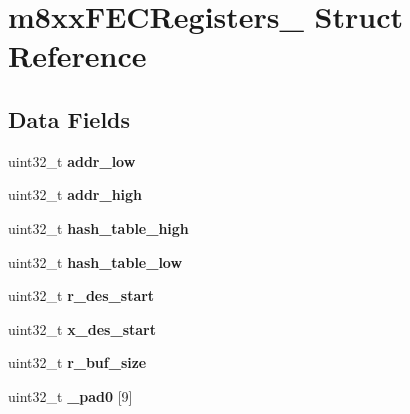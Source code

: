 \hypertarget{structm8xxFECRegisters__}{}\section{m8xx\+F\+E\+C\+Registers\+\_\+ Struct Reference}
\label{structm8xxFECRegisters__}
\subsection*{Data Fields}
\begin{DoxyCompactItemize}
\item 
\mbox{\label{structm8xxFECRegisters___a403c91a0a27969ad5ff0cdecac8ba1c1}} 
uint32\+\_\+t {\bfseries addr\+\_\+low}
\item 
\mbox{\label{structm8xxFECRegisters___a78554d25e00b6499fc61c8a0bd278b11}} 
uint32\+\_\+t {\bfseries addr\+\_\+high}
\item 
\mbox{\label{structm8xxFECRegisters___a0d68d7971866609df0a2274b83b3a658}} 
uint32\+\_\+t {\bfseries hash\+\_\+table\+\_\+high}
\item 
\mbox{\label{structm8xxFECRegisters___ac14f266e82f6b074ec0af35a035c05fc}} 
uint32\+\_\+t {\bfseries hash\+\_\+table\+\_\+low}
\item 
\mbox{\label{structm8xxFECRegisters___a5b8e32614e20ec15b4821bf156d1704d}} 
uint32\+\_\+t {\bfseries r\+\_\+des\+\_\+start}
\item 
\mbox{\label{structm8xxFECRegisters___a7a85a138d259c6ec208430dc84fcef56}} 
uint32\+\_\+t {\bfseries x\+\_\+des\+\_\+start}
\item 
\mbox{\label{structm8xxFECRegisters___a30c033068ee0dc29f7100880ff422ffe}} 
uint32\+\_\+t {\bfseries r\+\_\+buf\+\_\+size}
\item 
\mbox{\label{structm8xxFECRegisters___a3656261b409736c6b967646925ba136f}} 
uint32\+\_\+t {\bfseries \+\_\+pad0} \mbox{[}9\mbox{]}
\item 
\mbox{\label{structm8xxFECRegisters___abd819f5d5c6c84e7c26670c47f840e8c}} 

\end{DoxyCompactItemize}
